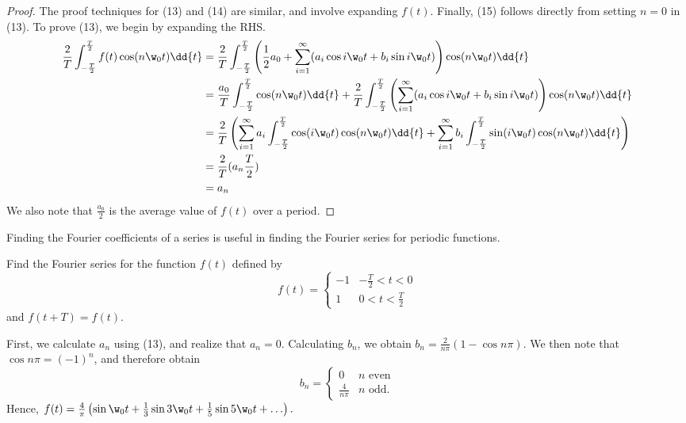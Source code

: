 \begin{proof}
The proof techniques for (13) and (14) are similar, and involve expanding $f(t)$. Finally, (15) follows directly from setting $n=0$ in (13). To prove (13), we begin by expanding the RHS.
\begin{equation} \begin{split}
\frac 2T\int_{-\frac T2}^{\frac T2}f(t)\cos(n\w_0t)\dd{t} &= \frac{2}{T}\int_{-\frac T2}^{\frac T2}\left(\frac{1}{2} a_0+\sum_{i=1}^\infty (a_i\cos i\w_0t+b_i\sin i\w_0t)\right)\cos(n\w_0t) \dd{t} \\ &= \frac{a_0}{T}\int_{-\frac{T}{2}}^{\frac T2}\cos(n\w_0t)\dd{t}+\frac{2}{T}\int_{-\frac T2}^{\frac T2}\left(\sum_{i=1}^\infty (a_i\cos i\w_0t+b_i\sin i\w_0t)\right)\cos(n\w_0t) \dd{t} \\ &= \frac{2}{T}\left(\sum_{i=1}^\infty a_i\int_{-\frac T2}^{\frac T2}\cos(i\w_0t)\cos(n\w_0t)\dd{t}+\sum_{i=1}^\infty b_i\int_{-\frac T2}^{\frac T2}\sin(i\w_0t)\cos(n\w_0t)\dd{t}\right) \\ &= \frac{2}{T}(a_n\frac{T}{2}) \\ &= a_n \qedhere \end{split}
\end{equation} We also note that $\frac{a_0}{2}$ is the average value of $f(t)$ over a period.
\end{proof}

\begin{rem} Finding the Fourier coefficients of a series is useful in finding the Fourier series for periodic functions. \end{rem}

\begin{eg} Find the Fourier series for the function $f(t)$ defined by $$f(t)=\begin{cases} -1 & -\frac T2<t<0 \\ 1 & 0<t<\frac T2 \end{cases}$$ and $f(t+T)=f(t)$. \end{eg}

\begin{soln} First, we calculate $a_n$ using (13), and realize that $a_n=0$. Calculating $b_n$, we obtain $b_n=\frac{2}{n\pi}(1-\cos n\pi)$. We then note that $\cos n\pi=(-1)^n$, and therefore obtain \begin{equation*} b_n=\begin{cases} 0 & n \mbox{ even} \\ \frac{4}{n\pi} & n \mbox{ odd.} \end{cases}
\end{equation*} Hence, $f(t)=\frac{4}{\pi}\left(\sin\w_0t+\frac{1}{3}\sin3\w_0t+\frac{1}{5}\sin5\w_0t+\ldots\right).$
\end{soln}

